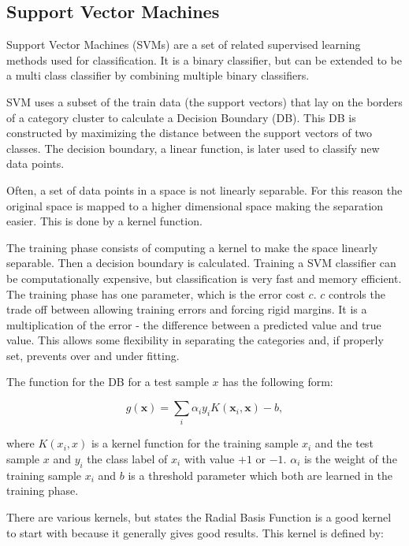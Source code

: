 \subsection*{Support Vector Machines}

Support Vector Machines (SVMs) are a set of related supervised learning methods used for classification. It is a binary classifier, but can be extended to be a multi class classifier by combining multiple binary classifiers. 

SVM uses a subset of the train data (the support vectors) that lay on the borders of a category cluster to calculate a Decision Boundary (DB). This DB is constructed by maximizing the distance between the support vectors of two classes. The decision boundary, a linear function, is later used to classify new data points.

Often, a set of data points in a space is not linearly separable. For this reason the original space is mapped to a higher dimensional space making the separation easier. This is done by a kernel function.

The training phase consists of computing a kernel to make the space linearly separable. Then a decision boundary is calculated. Training a SVM classifier can be computationally expensive, but classification is very fast and memory efficient. The training phase has one parameter, which is the error cost $c$. $c$ controls the trade off between allowing training errors and forcing rigid margins. It is a multiplication of the error - the difference between a predicted value and true value. This allows some flexibility in separating the categories and, if properly set, prevents over and under fitting.

The function for the DB for a test sample $x$ has the following form:

\begin{equation}
	g(\mathbf{x}) = \sum_i{\alpha_i y_i K(\mathbf{x}_i,\mathbf{x}) -b},
\end{equation}

where $K(x_i,x)$ is a kernel function for the training sample $x_i$ and the test sample $x$ and $y_i$ the class label of $x_i$ with value $+1$ or $-1$. $\alpha_i$ is the weight of the training sample $x_i$ and $b$ is a threshold parameter which both are learned in the training phase.  

There are various kernels, but \citep{Hsu2003} states the Radial Basis Function is a good kernel to start with because it generally gives good results. This kernel is defined by:

